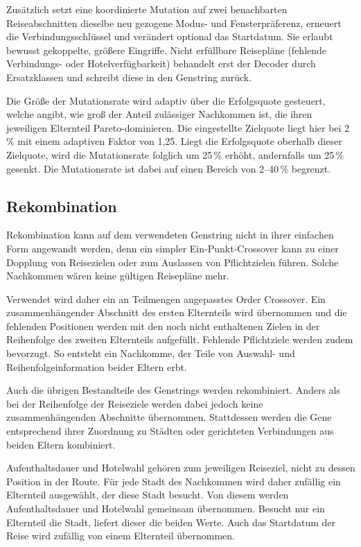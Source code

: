 Zusätzlich setzt eine koordinierte Mutation auf zwei benachbarten Reiseabschnitten dieselbe neu gezogene Modus- und Fensterpräferenz, erneuert die Verbindungsschlüssel und verändert optional das Startdatum. Sie erlaubt bewusst gekoppelte, größere Eingriffe. Nicht erfüllbare Reisepläne (fehlende Verbindungs- oder Hotelverfügbarkeit) behandelt erst der Decoder durch Ersatzklassen und schreibt diese in den Genstring zurück.

Die Größe der Mutationsrate wird adaptiv über die Erfolgsquote gesteuert, welche angibt, wie groß der Anteil zulässiger Nachkommen ist, die ihren jeweiligen Elternteil Pareto-dominieren. Die eingestellte Zielquote liegt hier bei 2\,\% mit einem adaptiven Faktor von 1,25. Liegt die Erfolgsquote oberhalb dieser Zielquote, wird die Mutationsrate folglich um 25\,\% erhöht, andernfalls um 25\,\% gesenkt. Die Mutationsrate ist dabei auf einen Bereich von 2--40\,\% begrenzt.

\subsection{Rekombination}
\label{subsec:rekombination}

Rekombination kann auf dem verwendeten Genstring nicht in ihrer einfachen Form angewandt werden, denn ein simpler Ein-Punkt-Crossover kann zu einer Dopplung von Reisezielen oder zum Auslassen von Pflichtzielen führen. Solche Nachkommen wären keine gültigen Reisepläne mehr.

Verwendet wird daher ein an Teilmengen angepasstes Order Crossover. Ein zusammenhängender Abschnitt des ersten Elternteils wird übernommen und die fehlenden Positionen werden mit den noch nicht enthaltenen Zielen in der Reihenfolge des zweiten Elternteils aufgefüllt. Fehlende Pflichtziele werden zudem bevorzugt. So entsteht ein Nachkomme, der Teile von Auswahl- und Reihenfolgeinformation beider Eltern erbt.

Auch die übrigen Bestandteile des Genstrings werden rekombiniert. Anders als bei der Reihenfolge der Reiseziele werden dabei jedoch keine zusammenhängenden Abschnitte übernommen. Stattdessen werden die Gene entsprechend ihrer Zuordnung zu Städten oder gerichteten Verbindungen aus beiden Eltern kombiniert.

Aufenthaltsdauer und Hotelwahl gehören zum jeweiligen Reiseziel, nicht zu dessen Position in der Route. Für jede Stadt des Nachkommen wird daher zufällig ein Elternteil ausgewählt, der diese Stadt besucht. Von diesem werden Aufenthaltsdauer und Hotelwahl gemeinsam übernommen. Besucht nur ein Elternteil die Stadt, liefert dieser die beiden Werte. Auch das Startdatum der Reise wird zufällig von einem Elternteil übernommen.


